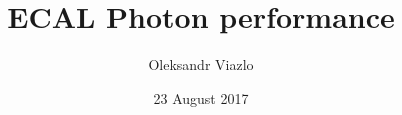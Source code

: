\documentclass[8pt]{beamer}
\newif\ifplacelogo %
\begin{document}
\newcommand{\myNode}{\tikz[baseline,inner sep=1pt] \node[anchor=base]}



\title[ ECAL Photon performance \hspace{13.5em}\insertframenumber/
\inserttotalframenumber]{ ECAL Photon performance }


	\author[Oleksandr Viazlo]{Oleksandr Viazlo \\ 
	}
	
       
	\date{23 August 2017}


	

   	

\placelogofalse
\end{document}
